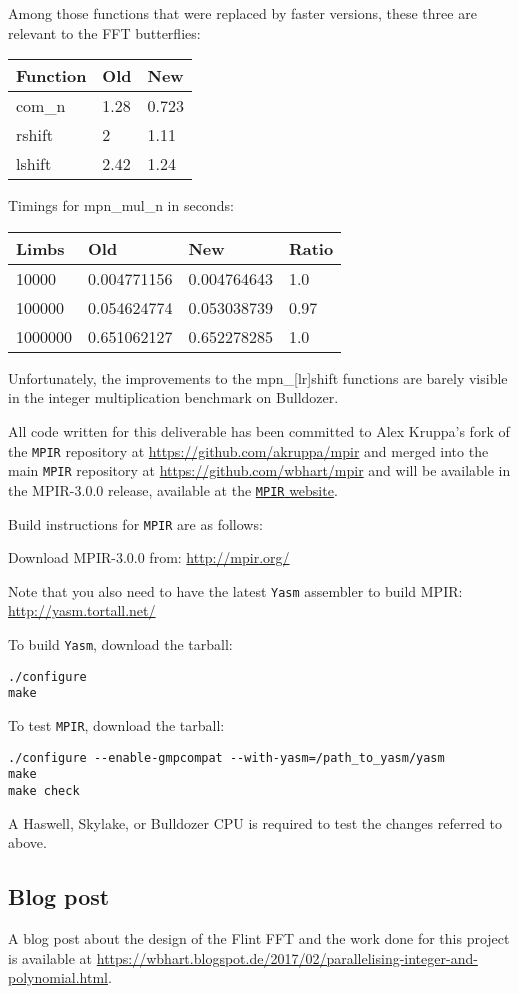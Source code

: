 Among those functions that were replaced by faster versions, these three
are relevant to the FFT butterflies:

\begin{longtable}[c]{@{}lll@{}}
\toprule
Function & Old & New\tabularnewline
\midrule
\endhead
com\_n & 1.28 & 0.723\tabularnewline
rshift & 2 & 1.11\tabularnewline
lshift & 2.42 & 1.24\tabularnewline
\bottomrule
\end{longtable}

Timings for mpn\_mul\_n in seconds:

\begin{longtable}[c]{@{}llll@{}}
\toprule
Limbs & Old & New & Ratio\tabularnewline
\midrule
\endhead
10000 & 0.004771156 & 0.004764643 & 1.0\tabularnewline
100000 & 0.054624774 & 0.053038739 & 0.97\tabularnewline
1000000 & 0.651062127 & 0.652278285 & 1.0\tabularnewline
\bottomrule
\end{longtable}

Unfortunately, the improvements to the mpn\_{[}lr{]}shift functions are
barely visible in the integer multiplication benchmark on Bulldozer.

All code written for this deliverable has been committed to Alex
Kruppa's fork of the \texttt{MPIR} repository at
\url{https://github.com/akruppa/mpir} and merged into the main
\texttt{MPIR} repository at \url{https://github.com/wbhart/mpir} and
will be available in the MPIR-3.0.0 release, available at the
\href{http://mpir.org/}{\texttt{MPIR} website}.

Build instructions for \texttt{MPIR} are as follows:

Download MPIR-3.0.0 from: \href{http://mpir.org}{http://mpir.org/}

Note that you also need to have the latest \texttt{Yasm} assembler to
build MPIR: \url{http://yasm.tortall.net/}

To build \texttt{Yasm}, download the tarball:

\begin{verbatim}
./configure
make
\end{verbatim}

To test \texttt{MPIR}, download the tarball:

\begin{verbatim}
./configure --enable-gmpcompat --with-yasm=/path_to_yasm/yasm
make
make check
\end{verbatim}

A Haswell, Skylake, or Bulldozer CPU is required to test the changes
referred to above.

\subsection{Blog post}\label{blog-post}

A blog post about the design of the Flint FFT and the work done for this
project is available at
\small \url{https://wbhart.blogspot.de/2017/02/parallelising-integer-and-polynomial.html}.
